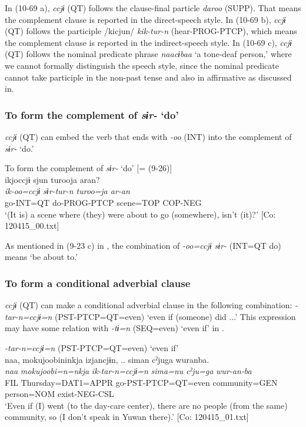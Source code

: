 \begin{xlist}
In (10-69 a), \textit{ccjɨ} (QT) follows the clause-final particle \textit{daroo} (SUPP). That means the complement clause is reported in the direct-speech style. In (10-69 b), \textit{ccjɨ} (QT) follows the participle /kicjun/ \textit{kik-tur-n} (hear-PROG-PTCP), which means the complement clause is reported in the indirect-speech style. In (10-69 c), \textit{ccjɨ} (QT) follows the nominal predicate phrase \textit{naacɨbaa} ‘a tone-deaf person,’ where we cannot formally distinguish the speech style, since the nominal predicate cannot take participle in the non-past tense and also in affirmative as discussed in.

\subsubsection{To form the complement of \textit{sɨr-} ‘do’}\label{sec:10.4.1.3}

\textit{ccjɨ} (QT) can embed the verb that ends with \textit{{}-oo} (INT) into the complement of \textit{sɨr-} ‘do.’

\ea\label{ex:10.70}   To form the complement of \textit{sɨr-} ‘do’ [= (9-26)]\\
      \glll    ikjoccjɨ  sjun  turooja  aran?\\
    \textit{ik-oo=ccjɨ}  \textit{sɨr{}-tur-n  turoo=ja  ar-an}\\
    go-INT=QT  do-PROG-PTCP  scene=TOP  COP-NEG\\
\glt     ‘(It is) a scene where (they) were about to go (somewhere), isn’t (it)?’  [Co: 120415\_00.txt]
\z

As mentioned in (9-23 c) in , the combination of \textit{{}-oo=ccjɨ sɨr-} (INT=QT do) means ‘be about to.’

\subsubsection{To form a conditional adverbial clause}\label{sec:10.4.1.4}

\textit{ccjɨ} (QT) can make a conditional adverbial clause in the following combination: \textit{{}-tar-n=ccjɨ=n} (PST-PTCP=QT=even) ‘even if (someone) did ...’ This expression may have some relation with \textit{{}-tɨ=n} (SEQ=even) ‘even if’ in .

\ea\label{ex:10.71}   \textit{{}-tar-n=ccjɨ=n} (PST-PTCP=QT=even) ‘even if’\\
  \ea  %
      \glll    naa,  {\textbar}mokujoobi{\textbar}ninkja  izjancjɨn, ..  siman  cˀjuga  wuranba.\\
      \textit{naa}  \textit{mokujoobi=n=nkja}  \textit{ik-tar-n=ccjɨ=n}  \textit{sima=nu}  \textit{cˀju=ga}  \textit{wur-an-ba}\\
      FIL  Thursday=DAT1=APPR  go-PST-PTCP=QT=even  community=GEN person=NOM  exist-NEG-CSL\\
      \glt       ‘Even if (I) went (to the day-care center), there are no people (from the same) community, so (I don’t speak in Yuwan there).’ [Co: 120415\_01.txt]


\end{xlist}
